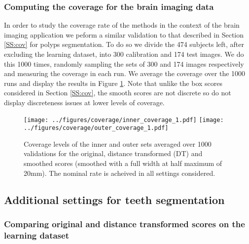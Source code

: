 \newpage
\subsubsection{Computing the coverage for the brain imaging data}\label{SS:val2}
In order to study the coverage rate of the methods in the context of the brain imaging application we peform a similar validation to that described in Section \ref{SS:cov} for polyps segmentation. To do so we divide the 474 subjects left, after excluding the learning dataset, into 300 calibration and 174 test images. We do this 1000 times, randomly sampling the sets of 300 and 174 images respectively and measuring the coverage in each run. We average the coverage over the 1000 runs and display the results in Figure \ref{fig:coverage2}. Note that unlike the box scores considered in Section \ref{SS:cov}, the smooth scores are not discrete so do not display discreteness issues at lower levels of coverage. 
\begin{figure}[h!]
	\begin{center}
		\texttt{[image: ../figures/coverage/inner\_coverage\_1.pdf]}
		\texttt{[image: ../figures/coverage/outer\_coverage\_1.pdf]}
	\end{center}
	\caption{Coverage levels of the inner and outer sets averaged over 1000 validations for the original, distance transformed (DT) and smoothed scores (smoothed with a full width at half maximum of 20mm). The nominal rate is acheived in all settings considered.}\label{fig:coverage2}
\end{figure}

\newpage
\subsection{Additional settings for teeth segmentation}\label{A:teeth}

\subsubsection{Comparing original and distance transformed scores on the learning dataset}\label{teethlearnorig}

